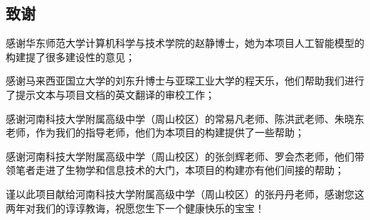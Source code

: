 \documentclass{article}
\begin{document}
\begin{multicols}{2}
\subsection{致谢}
\par
感谢华东师范大学计算机科学与技术学院的赵静博士，她为本项目人工智能模型的构建提了很多建设性的意见；
\par
感谢马来西亚国立大学的刘东升博士与亚琛工业大学的程天乐，他们帮助我们进行了提示文本与项目文档的英文翻译的审校工作；
\par
感谢河南科技大学附属高级中学（周山校区）的常易凡老师、陈洪武老师、朱晓东老师，作为我们的指导老师，他们为本项目的构建提供了一些帮助；
\par
感谢河南科技大学附属高级中学（周山校区）的张剑辉老师、罗会杰老师，他们带领笔者走进了生物学和信息技术的大门，本项目的构建亦有他们间接的帮助；
\par
谨以此项目献给河南科技大学附属高级中学（周山校区）的张丹丹老师，感谢您这两年对我们的谆谆教诲，祝愿您生下一个健康快乐的宝宝！


% 

\end{multicols}
\end{document}
